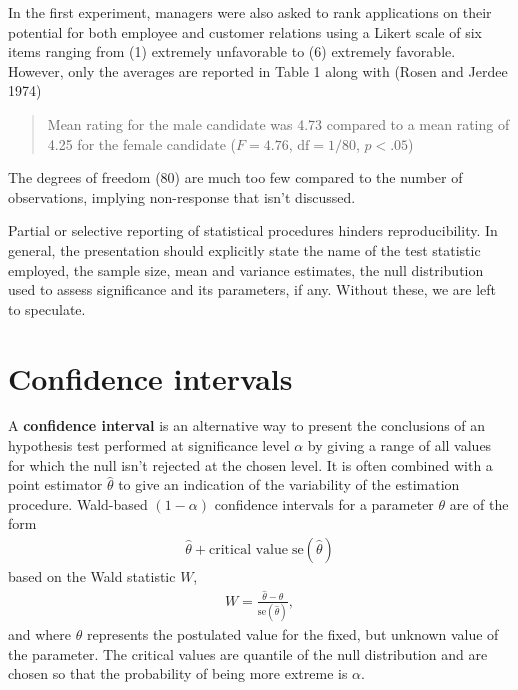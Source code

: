 \documentclass[
  11pt,
  letterpaper,
]{scrbook}
\theoremstyle{definition}
\theoremstyle{remark}
\begin{document}
\begin{tcolorbox}[enhanced jigsaw, colback=white, coltitle=black, rightrule=.15mm, left=2mm, bottomrule=.15mm, toprule=.15mm, titlerule=0mm, colframe=quarto-callout-caution-color-frame, leftrule=.75mm, title=\textcolor{quarto-callout-caution-color}{\faFire}\hspace{0.5em}{Pitfall}, breakable, arc=.35mm, colbacktitle=quarto-callout-caution-color!10!white, opacitybacktitle=0.6, opacityback=0, toptitle=1mm, bottomtitle=1mm]

In the first experiment, managers were also asked to rank applications
on their potential for both employee and customer relations using a
Likert scale of six items ranging from (1) extremely unfavorable to (6)
extremely favorable. However, only the averages are reported in Table 1
along with (Rosen and Jerdee 1974)

\begin{quote}
Mean rating for the male candidate was 4.73 compared to a mean rating of
4.25 for the female candidate (\(F=4.76\), \(\text{df} = 1/80\),
\(p < .05\))
\end{quote}

The degrees of freedom (80) are much too few compared to the number of
observations, implying non-response that isn't discussed.

Partial or selective reporting of statistical procedures hinders
reproducibility. In general, the presentation should explicitly state
the name of the test statistic employed, the sample size, mean and
variance estimates, the null distribution used to assess significance
and its parameters, if any. Without these, we are left to speculate.

\end{tcolorbox}

\hypertarget{confidence-intervals}{%
\section{Confidence intervals}\label{confidence-intervals}}

A \textbf{confidence interval} is an alternative way to present the
conclusions of an hypothesis test performed at significance level
\(\alpha\) by giving a range of all values for which the null isn't
rejected at the chosen level. It is often combined with a point
estimator \(\hat{\theta}\) to give an indication of the variability of
the estimation procedure. Wald-based \((1-\alpha)\) confidence intervals
for a parameter \(\theta\) are of the form \begin{align*}
\widehat{\theta} + \text{critical value} \; \mathrm{se}(\widehat{\theta})
\end{align*} based on the Wald statistic \(W\), \begin{align*}
W =\frac{\widehat{\theta}-\theta}{\mathrm{se}(\widehat{\theta})},
\end{align*} and where \(\theta\) represents the postulated value for
the fixed, but unknown value of the parameter. The critical values are
quantile of the null distribution and are chosen so that the probability
of being more extreme is \(\alpha\).
\end{document}
